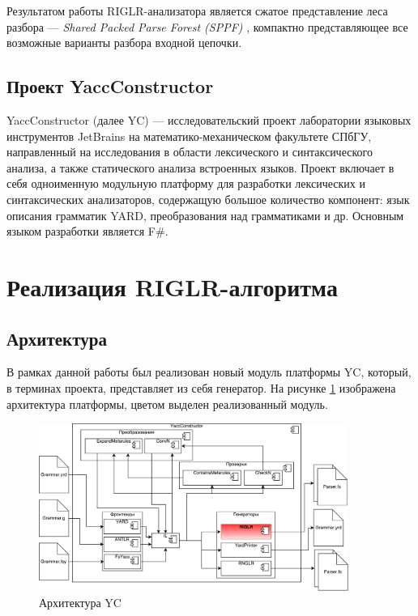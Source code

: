 \documentclass[14pt]{matmex-diploma-custom}
\begin{document}
Результатом работы RIGLR-анализатора является сжатое представление леса разбора --- \textit{Shared Packed Parse Forest (SPPF)} \cite{sppf}, компактно представляющее все возможные варианты разбора входной цепочки.

\subsection{Проект YaccConstructor}

YaccConstructor (далее YC) \cite{YC} --- исследовательский проект лаборатории языковых инструментов  JetBrains на математико-механическом факультете СПбГУ, направленный на исследования в области лексического и синтаксического анализа, а также статического анализа встроенных языков. Проект включает в себя одноименную модульную платформу для разработки лексических и синтаксических анализаторов, содержащую большое количество компонент: язык описания грамматик YARD, преобразования над грамматиками и др. Основным языком разработки является F$\#$.  

\section{Реализация RIGLR-алгоритма}
\subsection{Архитектура}
В рамках данной работы был реализован новый модуль платформы YC, который, в терминах проекта, представляет из себя генератор. На рисунке \ref{YCArch} изображена архитектура платформы, цветом выделен реализованный модуль.

\begin{figure}[h]
\centering
\includegraphics[width=0.9\textwidth]{pictures/YCArch.pdf}
\caption{Архитектура YC}
\label{YCArch}
\end{figure} 
\end{document}
